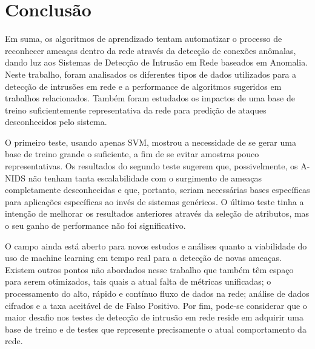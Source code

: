 \chapter{Conclusão}
\label{ch:conclusao}

Em suma, os algoritmos de aprendizado tentam automatizar o processo de reconhecer ameaças dentro da rede
através da detecção de conexões anômalas, dando luz aos Sistemas de Detecção de Intrusão em Rede baseados em Anomalia.
Neste trabalho, foram analisados os diferentes tipos de dados utilizados para a detecção de intrusões em rede e a
performance de algoritmos sugeridos em trabalhos relacionados. Também foram estudados os impactos de uma base de
treino suficientemente representativa da rede para predição de ataques desconhecidos pelo sistema.
\par O primeiro teste, usando apenas SVM, mostrou a necessidade de se gerar uma base de treino grande o suficiente, a
fim de se evitar amostras pouco representativas. Os resultados do segundo teste sugerem que, possivelmente, os A-NIDS
não tenham tanta escalabilidade com o surgimento de ameaças completamente desconhecidas e que, portanto, seriam
necessárias bases específicas para aplicações específicas ao invés de sistemas genéricos. O último teste tinha a
intenção de melhorar os resultados anteriores através da seleção de atributos, mas o seu ganho de performance não foi
significativo.
\par O campo ainda está aberto para novos estudos e análises quanto a viabilidade do uso de machine learning em tempo
real para a detecção de novas ameaças. Existem outros pontos não abordados nesse trabalho que também têm espaço para
serem otimizados, tais quais a atual falta de métricas unificadas; o processamento do alto, rápido e contínuo fluxo de
dados na rede; análise de dados cifrados e a taxa aceitável de de Falso Positivo. Por fim, pode-se considerar que
 o maior desafio nos testes de detecção de intrusão em rede reside em adquirir uma base de treino e de testes que
 represente precisamente o atual comportamento da rede.